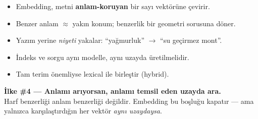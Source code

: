 \begin{itemize}
  \item Embedding, metni \textbf{anlam-koruyan} bir sayı vektörüne çevirir.
  \item Benzer anlam $\approx$ yakın konum; benzerlik bir geometri sorusuna döner.
  \item Yazım yerine \emph{niyeti} yakalar: ``yağmurluk'' $\to$ ``su geçirmez mont''.
  \item İndeks ve sorgu aynı modelle, aynı uzayda üretilmelidir.
  \item Tam terim önemliyse lexical ile birleştir (hybrid).
\end{itemize}

\begin{principlebox}
\textbf{İlke \#4 — Anlamı arıyorsan, anlamı temsil eden uzayda ara.}\\[4pt]
\normalsize Harf benzerliği anlam benzerliği değildir. Embedding bu boşluğu
kapatır --- ama yalnızca karşılaştırdığın her vektör \emph{aynı uzaydaysa}.
\end{principlebox}
